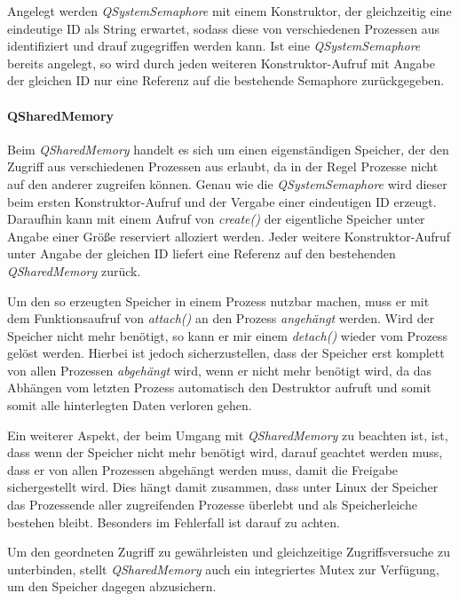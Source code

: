 Angelegt werden \emph{QSystemSemaphore}  mit einem Konstruktor, der gleichzeitig eine eindeutige ID als String erwartet, sodass diese von verschiedenen Prozessen aus identifiziert und drauf zugegriffen werden kann. Ist eine \emph{QSystemSemaphore} bereits angelegt, so wird durch jeden weiteren Konstruktor-Aufruf mit Angabe der gleichen ID nur eine Referenz auf die bestehende Semaphore zurückgegeben.
 
\paragraph{QSharedMemory}
Beim \emph{QSharedMemory} handelt es sich um einen eigenständigen Speicher, der den Zugriff aus verschiedenen Prozessen aus erlaubt, da in der Regel Prozesse nicht auf den anderer zugreifen können. Genau wie die \emph{QSystemSemaphore} wird dieser beim ersten Konstruktor-Aufruf und der Vergabe einer eindeutigen ID erzeugt. Daraufhin kann mit einem Aufruf von \emph{create()} der eigentliche Speicher unter Angabe einer Größe reserviert alloziert werden. Jeder weitere Konstruktor-Aufruf unter Angabe der gleichen ID liefert eine Referenz auf den bestehenden \emph{QSharedMemory} zurück.

Um den so erzeugten Speicher in einem Prozess nutzbar machen, muss er mit dem Funktionsaufruf von \emph{attach()} an den Prozess \emph{angehängt} werden. Wird der Speicher nicht mehr benötigt, so kann er mir einem \emph{detach()} wieder vom Prozess gelöst werden. Hierbei ist jedoch sicherzustellen, dass der Speicher erst komplett von allen Prozessen \emph{abgehängt} wird, wenn er nicht mehr benötigt wird, da das Abhängen vom letzten Prozess automatisch den Destruktor aufruft und somit somit alle hinterlegten Daten verloren gehen.

Ein weiterer Aspekt, der beim Umgang mit \emph{QSharedMemory} zu beachten ist, ist, dass wenn der Speicher nicht mehr benötigt wird, darauf geachtet werden muss, dass er von allen Prozessen abgehängt werden muss, damit die Freigabe sichergestellt wird. Dies hängt damit zusammen, dass unter Linux der Speicher das Prozessende aller zugreifenden Prozesse überlebt und als Speicherleiche bestehen bleibt. Besonders im Fehlerfall ist darauf zu achten.

Um den geordneten Zugriff zu gewährleisten und gleichzeitige Zugriffsversuche zu unterbinden, stellt \emph{QSharedMemory} auch ein integriertes Mutex zur Verfügung, um den Speicher dagegen abzusichern. 

